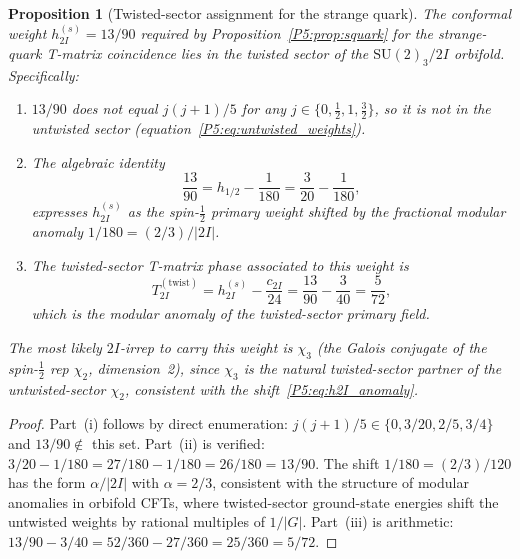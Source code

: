 \documentclass[11pt,a4paper]{article}
\newtheorem{proposition}[theorem]{Proposition}
\theoremstyle{definition}
\theoremstyle{remark}
\begin{document}
\begin{proposition}[Twisted-sector assignment for the strange quark]
\label{P5:prop:2i_strange_sector}
The conformal weight $h_{2I}^{(s)} = 13/90$ required by
Proposition~\ref{P5:prop:squark} for the strange-quark T-matrix coincidence
lies in the \emph{twisted sector} of the $\mathrm{SU}(2)_3/2I$ orbifold.
Specifically:
\begin{enumerate}[noitemsep,label=(\roman*)]
\item $13/90$ does not equal $j(j{+}1)/5$ for any $j \in \{0,\tfrac{1}{2},1,\tfrac{3}{2}\}$,
  so it is not in the untwisted sector (equation~\eqref{P5:eq:untwisted_weights}).
\item The algebraic identity
  \begin{equation}
    \frac{13}{90} = h_{1/2} - \frac{1}{180} = \frac{3}{20} - \frac{1}{180},
    \label{P5:eq:h2I_anomaly}
  \end{equation}
  expresses $h_{2I}^{(s)}$ as the spin-$\tfrac{1}{2}$ primary weight
  shifted by the fractional modular anomaly $1/180 = (2/3)/|2I|$.
\item The twisted-sector T-matrix phase associated to this weight is
  \begin{equation}
    T_{2I}^{(\mathrm{twist})} = h_{2I}^{(s)} - \frac{c_{2I}}{24}
    = \frac{13}{90} - \frac{3}{40} = \frac{5}{72},
    \label{P5:eq:T_twist_s}
  \end{equation}
  which is the modular anomaly of the twisted-sector primary field.
\end{enumerate}
The most likely $2I$-irrep to carry this weight is $\chi_3$ (the Galois
conjugate of the spin-$\tfrac{1}{2}$ rep $\chi_2$, dimension~2), since
$\chi_3$ is the natural twisted-sector partner of the untwisted-sector
$\chi_2$, consistent with the shift~\eqref{P5:eq:h2I_anomaly}.
\end{proposition}

\begin{proof}
Part~(i) follows by direct enumeration: $j(j{+}1)/5 \in \{0, 3/20, 2/5, 3/4\}$ and
$13/90 \notin$ this set.
Part~(ii) is verified: $3/20 - 1/180 = 27/180 - 1/180 = 26/180 = 13/90$.
The shift $1/180 = (2/3)/120$ has the form $\alpha/|2I|$ with $\alpha = 2/3$,
consistent with the structure of modular anomalies in orbifold CFTs,
where twisted-sector ground-state energies shift the untwisted weights
by rational multiples of $1/|G|$.
Part~(iii) is arithmetic: $13/90 - 3/40 = 52/360 - 27/360 = 25/360 = 5/72$.
\end{proof}
\end{document}
